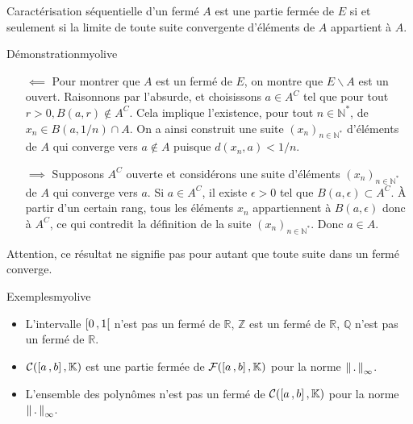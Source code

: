     \begin{prop}{Caractérisation séquentielle d’un fermé}{}
        $A$ est une partie fermée de $E$ si et seulement si la limite de toute suite convergente d’éléments de $A$ appartient à $A$.
    \end{prop}

    \begin{demo}{Démonstration}{myolive}
        \begin{itemize}
            \item[$\impliedby$] Pour montrer que $A$ est un fermé de $E$, on montre que $E \backslash A$ est un ouvert. Raisonnons par l’absurde, et choisissons $a \in A^C$ tel que pour tout $r > 0, B(a,r) \notin A^C$. Cela implique l’existence, pour tout $n \in \mathbb{N}^*$, de $x_n \in B(a,1/n) \cap A$. On a ainsi construit une suite $(x_n)_{n \in \mathbb{N}^*}$ d’éléments de $A$ qui converge vers $a \notin A$ puisque $d(x_n,a) < 1/n$.
            \item[$\implies$] Supposons $A^C$ ouverte et considérons une suite d’éléments $(x_n)_{n \in \mathbb{N}^*}$ de $A$ qui converge vers $a$. Si $a \in A^C$, il existe $\epsilon > 0$ tel que $B(a,\epsilon) \subset A^C$. À partir d’un certain rang, tous les éléments $x_n$ appartiennent à $B(a,\epsilon)$ donc à $A^C$, ce qui contredit la définition de la suite $(x_n)_{n \in \mathbb{N}^*}$. Donc $a \in A$. 
        \end{itemize}
    \end{demo}

    Attention, ce résultat ne signifie pas pour autant que toute suite dans un fermé converge.

    \begin{omed}{Exemples}{myolive}
        \begin{itemize}
            \item L’intervalle $\left[ 0 \, , 1 \right[$ n’est pas un fermé de $\mathbb{R}$, $\mathbb{Z}$ est un fermé de $\mathbb{R}$, $\mathbb{Q}$ n’est pas un fermé de $\mathbb{R}$.
            \item $\mathcal{C}(\left[ a \, , b \right],\mathbb{K})$ est une partie fermée de $\mathcal{F}(\left[ a \, , b \right],\mathbb{K})$ pour la norme $\left\lVert\,.\,\right\rVert_{\infty}$.
            \item L’ensemble des polynômes n’est pas un fermé de $\mathcal{C}(\left[ a \, , b \right],\mathbb{K})$ pour la norme $\left\lVert\,.\,\right\rVert_{\infty}$.
        \end{itemize}
    \end{omed}

